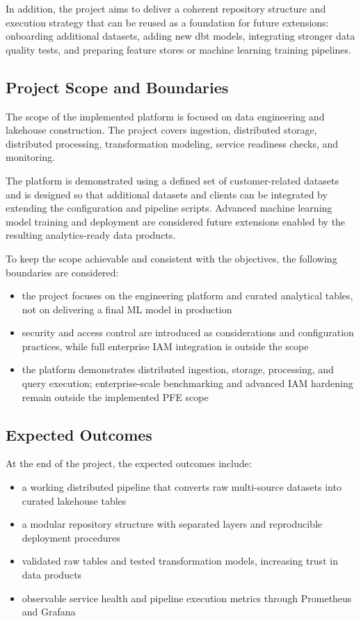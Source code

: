 In addition, the project aims to deliver a coherent repository structure and execution strategy that can be reused as a foundation for future extensions: onboarding additional datasets, adding new dbt models, integrating stronger data quality tests, and preparing feature stores or machine learning training pipelines.

\subsection{Project Scope and Boundaries}
The scope of the implemented platform is focused on data engineering and lakehouse construction. The project covers ingestion, distributed storage, distributed processing, transformation modeling, service readiness checks, and monitoring.

The platform is demonstrated using a defined set of customer-related datasets and is designed so that additional datasets and clients can be integrated by extending the configuration and pipeline scripts. Advanced machine learning model training and deployment are considered future extensions enabled by the resulting analytics-ready data products.

To keep the scope achievable and consistent with the objectives, the following boundaries are considered:
\begin{itemize}
    \item the project focuses on the engineering platform and curated analytical tables, not on delivering a final ML model in production
    \item security and access control are introduced as considerations and configuration practices, while full enterprise IAM integration is outside the scope
    \item the platform demonstrates distributed ingestion, storage, processing, and query execution; enterprise-scale benchmarking and advanced IAM hardening remain outside the implemented PFE scope
\end{itemize}

\subsection{Expected Outcomes}
At the end of the project, the expected outcomes include:
\begin{itemize}
    \item a working distributed pipeline that converts raw multi-source datasets into curated lakehouse tables
    \item a modular repository structure with separated layers and reproducible deployment procedures
    \item validated raw tables and tested transformation models, increasing trust in data products
    \item observable service health and pipeline execution metrics through Prometheus and Grafana
\end{itemize}

